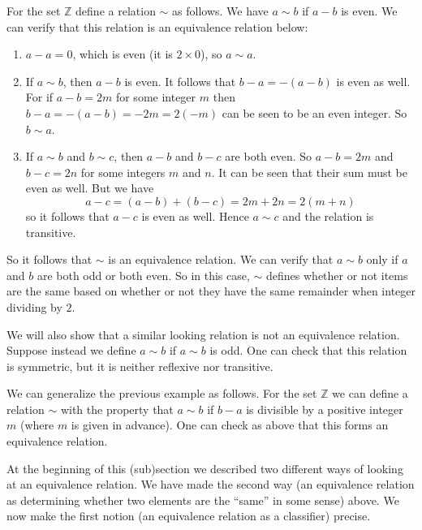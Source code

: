 \begin{example}\label{even_odd_eqr}
For the set $\mathbb{Z}$ define a relation $\sim$ as follows. We have $a \sim b$ if $a - b$ is even. We can verify that this relation is an equivalence relation below:
\begin{enumerate}
	\item $a-a = 0$, which is even (it is $2 \times 0$), so $a \sim a$.
	\item If $a \sim b$, then $a - b$ is even. It follows that $b - a = -(a-b)$ is even as well. For if $a - b = 2m$ for some integer $m$ then $b - a = -(a-b) = -2m = 2(-m)$ can be seen to be an even integer. So $b \sim a$.
	\item If $a \sim b$ and $b \sim c$, then $a - b$ and $b - c$ are both even. So $a - b = 2m$ and $b - c = 2n$ for some integers $m$ and $n$. It can be seen that their sum must be even as well. But we have
	\[a - c = (a - b) + (b - c) = 2m + 2n = 2(m + n)\]
	so it follows that $a - c$ is even as well. Hence $a \sim c$ and the relation is transitive.
\end{enumerate}

So it follows that $\sim$ is an equivalence relation. We can verify that $a \sim b$ only if $a$ and $b$ are both odd or both even. So in this case, $\sim$ defines whether or not items are the same based on whether or not they have the same remainder when integer dividing by $2$.

We will also show that a similar looking relation is not an equivalence relation. Suppose instead we define $a \sim b$ if $a \sim b$ is odd. One can check that this relation is symmetric, but it is neither reflexive nor transitive.
\end{example}

\begin{example}\label{modm_eqr}
We can generalize the previous example as follows. For the set $\mathbb{Z}$ we can define a relation $\sim$ with the property that $a \sim b$ if $b - a$ is divisible by a positive integer $m$ (where $m$ is given in advance). One can check as above that this forms an equivalence relation.
\end{example}

At the beginning of this (sub)section we described two different ways of looking at an equivalence relation. We have made the second way (an equivalence relation as determining whether two elements are the ``same'' in some sense) above. We now make the first notion (an equivalence relation as a classifier) precise.

